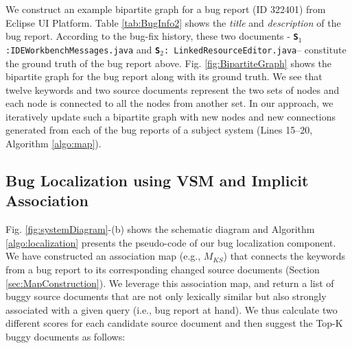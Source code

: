 \documentclass[conference]{IEEEtran}
\begin{document}
We construct an example bipartite graph for a bug report (ID 322401) from Eclipse UI Platform. Table \ref{tab:BugInfo2} shows the \textit{title} and \textit{description} of the bug report. According to the bug-fix history, these two documents - \texttt{\textbf{S$_1$}:IDEWorkbenchMessages.java} and \texttt{\textbf{S$_2$}: LinkedResourceEditor.java}-- constitute the ground truth of the bug report above. Fig. \ref{fig:BipartiteGraph} shows the bipartite graph for the bug report along with its ground truth. We see that twelve keywords and two source documents represent the two sets of nodes and each node is connected to all the nodes from another set. In our approach, we iteratively update such a bipartite graph with new nodes and new connections generated from each of the bug reports of a subject system (Lines 15--20, Algorithm \ref{algo:map}).     



\subsection{Bug Localization using VSM and Implicit Association}\label{sec:vsm-assoc-sore}
Fig. \ref{fig:systemDiagram}-(b) shows the schematic diagram
and Algorithm \ref{algo:localization} presents the pseudo-code
of our bug localization component.
We have constructed an association map (e.g., $M_{KS}$) that connects the keywords from a bug report to its corresponding changed source documents (Section \ref{sec:MapConstruction}). We leverage this association map, and return a list of buggy source documents that are not only lexically similar but also strongly associated with a given query (i.e., bug report at hand). We thus calculate two different scores for each candidate source document and then suggest the Top-K buggy documents as follows:

\end{document}
